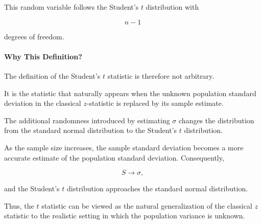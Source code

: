 \documentclass[11pt]{article}
\begin{document}
\begin{mdframed}[
		linewidth=0.8pt,
		roundcorner=6pt,
		backgroundcolor=gray!5,
		linecolor=gray!60,
		innertopmargin=10pt,
		innerbottommargin=10pt,
		innerleftmargin=10pt,
		innerrightmargin=10pt
		]
		This random variable follows the Student's $t$ distribution with
		
		\[
		n-1
		\]
		
		degrees of freedom.
		
		\paragraph{Why This Definition?}
		
		The definition of the Student's $t$ statistic is therefore not arbitrary.
		
		It is the statistic that naturally appears when the unknown population
		standard deviation in the classical $z$-statistic is replaced by its sample
		estimate.
		
		The additional randomness introduced by estimating $\sigma$ changes the
		distribution from the standard normal distribution to the Student's
		$t$ distribution.
		
		As the sample size increases, the sample standard deviation becomes a more
		accurate estimate of the population standard deviation. Consequently,
		
		\[
		S
		\longrightarrow
		\sigma,
		\]
		
		and the Student's $t$ distribution approaches the standard normal
		distribution.
		
		Thus, the $t$ statistic can be viewed as the natural generalization of the
		classical $z$ statistic to the realistic setting in which the population
		variance is unknown.
		
	\end{mdframed}
	
\end{document}
